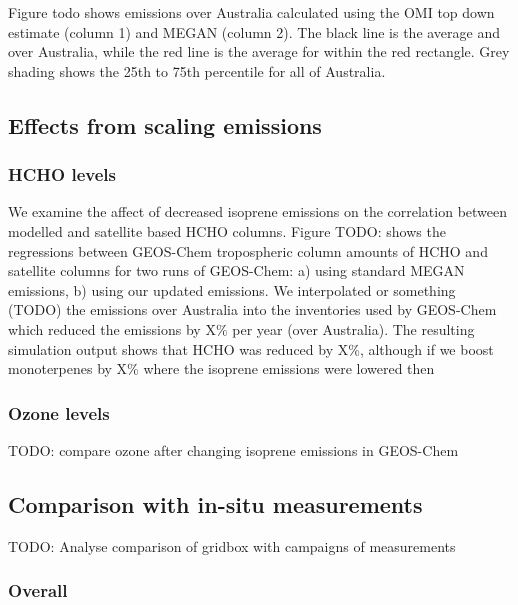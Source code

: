     
    
    Figure todo shows emissions over Australia calculated using the OMI top down estimate (column 1) and MEGAN (column 2). 
    The black line is the average and over Australia, while the red line is the average for within the red rectangle. 
    Grey shading shows the 25th to 75th percentile for all of Australia.
    
  \subsection{Effects from scaling emissions}
    
    \subsubsection{HCHO levels}
      
      We examine the affect of decreased isoprene emissions on the correlation between modelled and satellite based HCHO columns.
      Figure TODO: shows the regressions between GEOS-Chem tropospheric column amounts of HCHO and satellite columns for two runs of GEOS-Chem: a) using standard MEGAN emissions, b) using our updated emissions.
      We interpolated or something (TODO) the emissions over Australia into the inventories used by GEOS-Chem which reduced the emissions by X\% per year (over Australia).
      The resulting simulation output shows that HCHO was reduced by X\%, although if we boost monoterpenes by X\% where the isoprene emissions were lowered then 
  
    \subsubsection{Ozone levels}
  
      TODO: compare ozone after changing isoprene emissions in GEOS-Chem
  
  \subsection{Comparison with in-situ measurements}
    
    TODO: %
    Analyse comparison of gridbox with campaigns of measurements
    
    \subsubsection{Overall}
      
